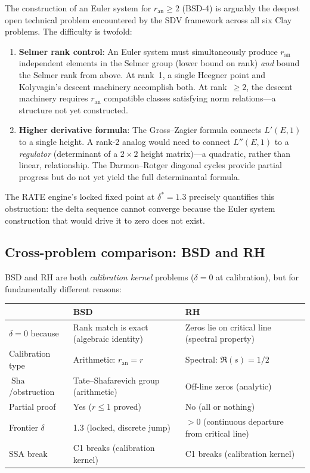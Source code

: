 \documentclass[11pt]{article}
\DeclareMathOperator{\Sha}{Sha}
\begin{document}
The construction of an Euler system for $r_{\mathrm{an}} \geq 2$ (BSD-4) is
arguably the deepest open technical problem encountered by the SDV framework
across all six Clay problems.  The difficulty is twofold:

\begin{enumerate}
  \item \textbf{Selmer rank control}: An Euler system must simultaneously
    produce $r_{\mathrm{an}}$ independent elements in the Selmer group (lower
    bound on rank) \emph{and} bound the Selmer rank from above.  At rank~1,
    a single Heegner point and Kolyvagin's descent machinery accomplish both.
    At rank~$\geq 2$, the descent machinery requires $r_{\mathrm{an}}$
    compatible classes satisfying norm relations---a structure not yet
    constructed.

  \item \textbf{Higher derivative formula}: The Gross--Zagier formula connects
    $L'(E,1)$ to a single height.  A rank-2 analog would need to connect
    $L''(E,1)$ to a \emph{regulator} (determinant of a $2 \times 2$ height
    matrix)---a quadratic, rather than linear, relationship.  The
    Darmon--Rotger diagonal cycles provide partial progress but do not yet
    yield the full determinantal formula.
\end{enumerate}

\noindent
The RATE engine's locked fixed point at $\delta^* = 1.3$ precisely quantifies
this obstruction: the delta sequence cannot converge because the Euler system
construction that would drive it to zero does not exist.

\subsection{Cross-problem comparison: BSD and RH}

BSD and RH are both \emph{calibration kernel} problems ($\delta = 0$ at
calibration), but for fundamentally different reasons:

\begin{center}
\begin{tabular}{lp{5cm}p{5cm}}
\hline
& \textbf{BSD} & \textbf{RH} \\
\hline
$\delta = 0$ because & Rank match is exact (algebraic identity) & Zeros lie on
  critical line (spectral property) \\
Calibration type & Arithmetic: $r_{\mathrm{an}} = r$ & Spectral: $\Re(s) = 1/2$ \\
$\Sha$/obstruction & Tate--Shafarevich group (arithmetic) & Off-line zeros
  (analytic) \\
Partial proof & Yes ($r \leq 1$ proved) & No (all or nothing) \\
Frontier $\delta$ & 1.3 (locked, discrete jump) & $> 0$ (continuous departure
  from critical line) \\
SSA break & C1 breaks (calibration kernel) & C1 breaks (calibration kernel) \\
\hline
\end{tabular}
\end{center}
\end{document}
